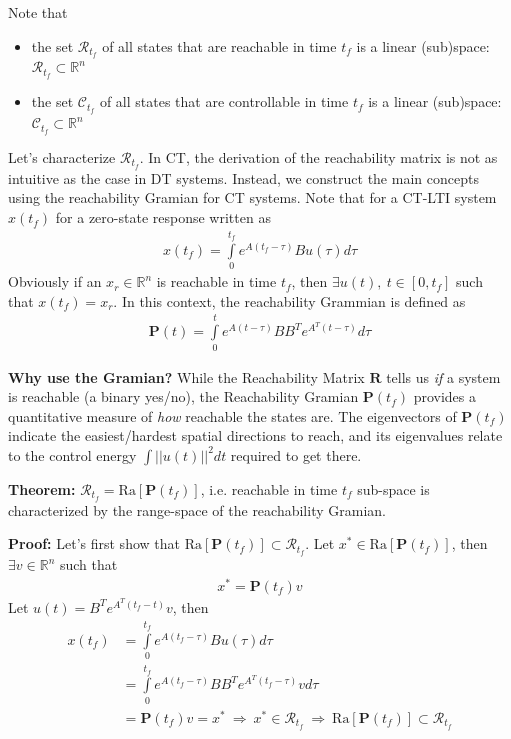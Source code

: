 \documentclass[twoside]{article}
\begin{document}
Note that
\begin{itemize}
  \item the set $\mathcal{R}_{t_f}$ of all states that are reachable in time $t_f$ is a linear
(sub)space: $\mathcal{R}_{t_f} \subset \mathbb{R}^n$
  \item the set $\mathcal{C}_{t_f}$ of all states that are controllable in time $t_f$ is a linear
(sub)space: $\mathcal{C}_{t_f} \subset \mathbb{R}^n$
\end{itemize}

Let's characterize $\mathcal{R}_{t_f}$. In CT, the derivation of the reachability 
matrix is not as intuitive as the case in DT systems. Instead, we construct the
main concepts using the reachability Gramian for CT systems. Note that 
for a CT-LTI system $x(t_f)$ for a zero-state response written as
%
\begin{align*}
  x(t_f) = \int\limits_{0}^{t_f} e^{A (t_f - \tau)} B u(\tau) d \tau
\end{align*}
%
Obviously if an $x_r \in \mathbb{R}^n$ is reachable in time $t_f$, 
then $\exists u(t), \ t \in [0 , t_f]$ such that $x(t_f) = x_r$. In this context,
the reachability Grammian is defined as
%
\begin{align}
    \textbf{P}(t) = \int\limits_{0}^{t} e^{A (t - \tau)} B B^T e^{A^T (t - \tau)}  d \tau 
\end{align}
%

\begin{intuition}
\textbf{Why use the Gramian?} 
While the Reachability Matrix $\mathbf{R}$ tells us \textit{if} a system is reachable (a binary yes/no), the Reachability Gramian $\textbf{P}(t_f)$ provides a quantitative measure of \textit{how} reachable the states are. The eigenvectors of $\textbf{P}(t_f)$ indicate the easiest/hardest spatial directions to reach, and its eigenvalues relate to the control energy $\int ||u(t)||^2 dt$ required to get there.
\end{intuition}

\textbf{Theorem:} $\mathcal{R}_{t_f} = \mathrm{Ra}[ \textbf{P}(t_f) ]$, i.e. reachable in time $t_f$ sub-space is characterized by the range-space of the reachability Gramian.

\textbf{Proof:} Let's first show that $\mathrm{Ra}[ \textbf{P}(t_f) ] \subset \mathcal{R}_{t_f}$.
Let $x^* \in \mathrm{Ra}[ \textbf{P}(t_f) ]$, then $\exists v \in \mathbb{R}^n$ such that 
%
\begin{align}
    x^* = \textbf{P}(t_f) v
\end{align}
%
Let $u(t) = B^T e^{A^T (t_f - t)} v$, then
%
\begin{align*}
  x(t_f) &= \int\limits_{0}^{t_f} e^{A (t_f - \tau)} B u(\tau) d \tau
  \\
  &= \int\limits_{0}^{t_f} e^{A (t_f - \tau)} B B^T e^{A^T (t_f - \tau)} v d \tau
  \\
  &= \textbf{P}(t_f) v = x^* \ \Rightarrow \ x^* \in  \mathcal{R}_{t_f} 
  \ \Rightarrow \ \mathrm{Ra}[ \textbf{P}(t_f) ] \subset \mathcal{R}_{t_f}
\end{align*}
\end{document}
